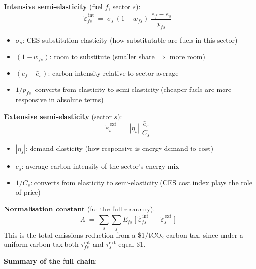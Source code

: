\documentclass[11pt,a4paper]{article}
\begin{document}
\textbf{Intensive semi-elasticity} (fuel $f$, sector $s$):
\begin{equation}
\boxed{\;
\tilde{\varepsilon}^{\,\mathrm{int}}_{fs} \;=\; \sigma_s\,(1-w_{fs})\;\frac{e_f - \bar{e}_s}{p_{fs}}
\;}
\end{equation}
\begin{itemize}\setlength\itemsep{0pt}
\item $\sigma_s$: CES substitution elasticity (how substitutable are fuels in this sector)
\item $(1-w_{fs})$: room to substitute (smaller share $\Rightarrow$ more room)
\item $(e_f - \bar{e}_s)$: carbon intensity relative to sector average
\item $1/p_{fs}$: converts from elasticity to semi-elasticity (cheaper fuels are more responsive in absolute terms)
\end{itemize}

\vspace{0.5em}

\textbf{Extensive semi-elasticity} (sector $s$):
\begin{equation}
\boxed{\;
\tilde{\varepsilon}^{\,\mathrm{ext}}_{s} \;=\; |\eta_s|\;\frac{\bar{e}_s}{C_s}
\;}
\end{equation}
\begin{itemize}\setlength\itemsep{0pt}
\item $|\eta_s|$: demand elasticity (how responsive is energy demand to cost)
\item $\bar{e}_s$: average carbon intensity of the sector's energy mix
\item $1/C_s$: converts from elasticity to semi-elasticity (CES cost index plays the role of price)
\end{itemize}

\vspace{0.5em}

\textbf{Normalisation constant} (for the full economy):
\begin{equation}
\Lambda \;=\; \sum_s\sum_f E_{fs}\;\Big[\;\tilde{\varepsilon}^{\,\mathrm{int}}_{fs} \;+\; \tilde{\varepsilon}^{\,\mathrm{ext}}_s\;\Big]
\end{equation}
This is the total emissions reduction from a \$1/tCO$_2$ carbon tax, since under a uniform carbon tax both $\tau^{\mathrm{int}}_{fs}$ and $\tau^{\mathrm{ext}}_s$ equal \$1.

\vspace{1em}

\textbf{Summary of the full chain:}
\end{document}
